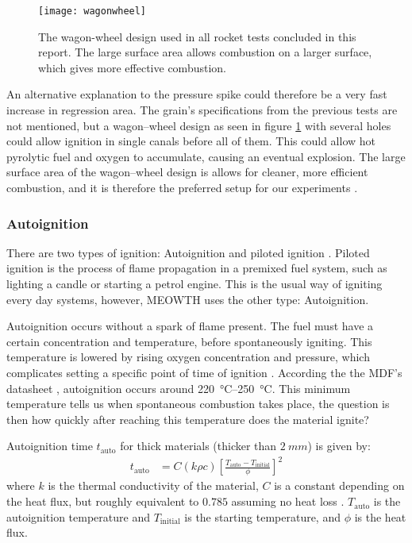 			\begin{figure}
				\centering
				\texttt{[image: wagonwheel]}
				\caption{The wagon-wheel design used in all rocket tests concluded in this report. The large surface area allows combustion on a larger surface, which gives more effective combustion.}
				\label{fig:wagonwheel}
			\end{figure}

		An alternative explanation to the pressure spike could therefore be a very fast increase in regression area. The grain's specifications from the previous tests are not mentioned, but a wagon--wheel design as seen in figure \ref{fig:wagonwheel} with several holes could allow ignition in single canals before all of them. This could allow hot pyrolytic fuel and oxygen to accumulate, causing an eventual explosion. The large surface area of the wagon--wheel design is allows for cleaner, more efficient combustion, and it is therefore the preferred setup for our experiments \cite{nakka}.

	\subsubsection{Autoignition}

		There are two types of ignition: Autoignition and piloted ignition \cite{principlesoffire}. Piloted ignition is the process of flame propagation in a premixed fuel system, such as lighting a candle or starting a petrol engine. This is the usual way of igniting every day systems, however, MEOWTH uses the other type: Autoignition.

		Autoignition occurs without a spark of flame present. The fuel must have a certain concentration and temperature, before spontaneously igniting. This temperature is lowered by rising oxygen concentration and pressure, which complicates setting a specific point of time of ignition \cite{ASTMautoign}. According the the MDF's datasheet \cite{mdfAIT}, autoignition occurs around \SIrange{220}{250}{\celsius}. This minimum temperature tells us when spontaneous combustion takes place, the question is then how quickly after reaching this temperature does the material ignite?

		Autoignition time $t_\text{auto}$ for thick materials (thicker than $\SI{2}{mm}$) is given by:
		\begin{align*}
			t_\text{auto} &= C (k \rho c) \left[\frac{T_\text{auto} - T_\text{initial}}{\phi} \right]^2
		\end{align*}
		where $k$ is the thermal conductivity of the material, $C$ is a constant depending on the heat flux, but roughly equivalent to $0.785$ assuming no heat loss \cite{principlesoffire}. $T_\text{auto}$ is the autoignition temperature and $T_\text{initial}$ is the starting temperature, and $\phi$ is the heat flux.

